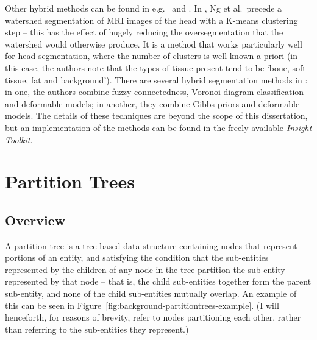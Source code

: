 Other hybrid methods can be found in e.g.~\cite{ng06} and \cite{itk}. In \cite{ng06}, Ng et al.\ precede a watershed segmentation of MRI images of the head with a K-means clustering step -- this has the effect of hugely reducing the oversegmentation that the watershed would otherwise produce. It is a method that works particularly well for head segmentation, where the number of clusters is well-known a priori (in this case, the authors note that the types of tissue present tend to be `bone, soft tissue, fat and background'). There are several hybrid segmentation methods in \cite{itk}: in one, the authors combine fuzzy connectedness, Voronoi diagram classification and deformable models; in another, they combine Gibbs priors and deformable models. The details of these techniques are beyond the scope of this dissertation, but an implementation of the methods can be found in the freely-available \emph{Insight Toolkit}.

\clearpage

\section{Partition Trees}
\label{sec:background-partitiontrees}


\subsection{Overview}

A partition tree is a tree-based data structure containing nodes that represent portions of an entity, and satisfying the condition that the sub-entities represented by the children of any node in the tree partition the sub-entity represented by that node -- that is, the child sub-entities together form the parent sub-entity, and none of the child sub-entities mutually overlap. An example of this can be seen in Figure~\ref{fig:background-partitiontrees-example}. (I will henceforth, for reasons of brevity, refer to nodes partitioning each other, rather than referring to the sub-entities they represent.)


